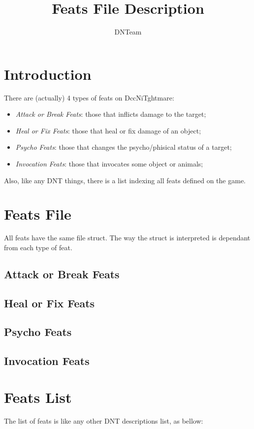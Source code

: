 \documentclass[letterpaper,12pt]{article}
\begin{document}
\title{Feats File Description}

\author{
DNTeam
}

\maketitle



\section{Introduction}

There are (actually) 4 types of feats on DccNiTghtmare:

\begin{itemize}
\item{{\it Attack or Break Feats}: those that inflicts damage to the target;}
\item{{\it Heal or Fix Feats}: those that heal or fix damage of an object;}
\item{{\it Psycho Feats}: those that changes the psycho/phisical status of a
target;} 
\item{{\it Invocation Feats}: those that invocates some object or animals;}
\end{itemize}

Also, like any DNT things, there is a list indexing all feats defined
on the game.

\section{Feats File}

All feats have the same file struct. The way the struct is interpreted is
dependant from each type of feat.

\subsection{Attack or Break Feats}

\subsection{Heal or Fix Feats}

\subsection{Psycho Feats}

\subsection{Invocation Feats}

\section{Feats List}

The list of feats is like any other DNT descriptions list, as bellow:
\end{document}
